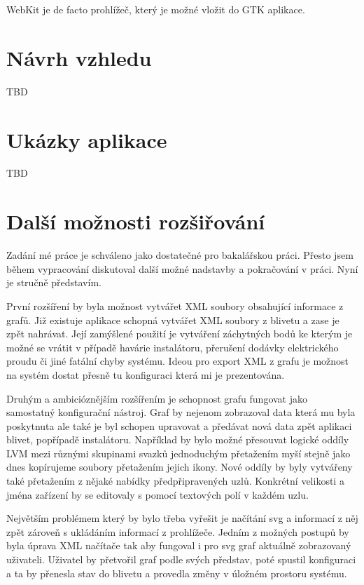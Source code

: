 \documentclass[color,table,oneside,nolot,nolof]{fithesis}
\begin{document}
	WebKit je de facto prohlížeč, který je možné vložit do GTK aplikace.

\chapter{Návrh vzhledu}
TBD

\chapter{Ukázky aplikace}
TBD

\chapter{Další možnosti rozšiřování}
	Zadání mé práce je schváleno jako dostatečné pro bakalářskou práci. Přesto jsem během vypracování diskutoval další možné nadstavby a pokračování v práci. Nyní je stručně představím.

	První rozšíření by byla možnost vytvářet XML soubory obsahující informace z grafů. Již existuje aplikace schopná vytvářet XML soubory z blivetu a zase je zpět nahrávat. Její zamýšlené
	použití je vytváření záchytných bodů ke kterým je možné se vrátit v případě havárie instalátoru, přerušení dodávky elektrického proudu či jiné fatální chyby systému. Ideou pro export
	XML z grafu je možnost na systém dostat přesně tu konfiguraci která mi je prezentována.

	Druhým a ambicióznějším rozšířením je schopnost grafu fungovat jako samostatný konfigurační nástroj. Graf by nejenom zobrazoval data která mu byla poskytnuta ale také je byl
	schopen upravovat a předávat nová data zpět aplikaci blivet, popřípadě instalátoru. Například by bylo možné přesouvat logické oddíly LVM mezi různými skupinami svazků jednoduchým 
	přetažením myší stejně jako dnes kopírujeme soubory přetažením jejich ikony. Nové oddíly by byly vytvářeny také přetažením z nějaké nabídky předpřipravených uzlů. Konkrétní velikosti
	a jména zařízení by se editovaly s pomocí textových polí v každém uzlu.
	
	Největším problémem který by bylo třeba vyřešit je načítání svg a informací z něj zpět zároveň s ukládáním informací z prohlížeče. 
	Jedním z možných postupů by byla úprava XML načítače tak aby fungoval i pro svg graf aktuálně zobrazovaný uživateli. Uživatel by přetvořil graf podle svých představ, poté spustil 
	konfiguraci a ta by přenesla stav do blivetu a provedla změny v úložném prostoru systému. 

	\printbibliography
\end{document}
